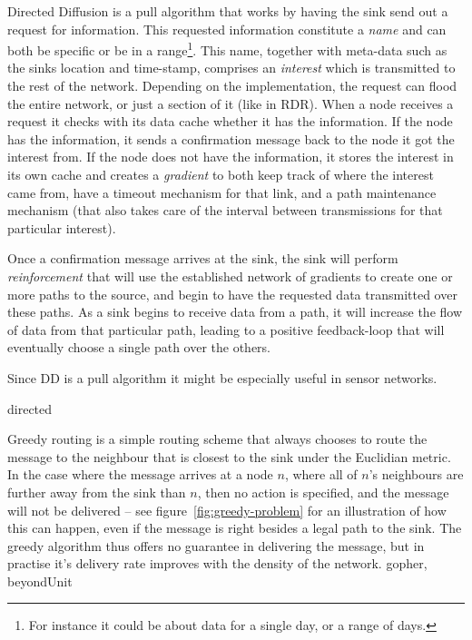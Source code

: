 \begin{description}
{Directed Diffusion is a pull algorithm that works by having the sink send out a request for information. This requested information constitute a \emph{name} and can both be specific or be in a range\footnote{For instance it could be about data for a single day, or a range of days.}. This name, together with meta-data such as the sinks location and time-stamp, comprises an \emph{interest} which is transmitted to the rest of the network. Depending on the implementation, the request can flood the entire network, or just a section of it (like in RDR). When a node receives a request it checks with its data cache whether it has the information. If the node has the information, it sends a confirmation message back to the node it got the interest from. If the node does not have the information, it stores the interest in its own cache and creates a \emph{gradient} to both keep track of where the interest came from, have a timeout mechanism for that link, and a path maintenance mechanism (that also takes care of the interval between transmissions for that particular interest). 

Once a confirmation message arrives at the sink, the sink will perform \emph{reinforcement} that will use the established network of gradients to create one or more paths to the source, and begin to have the requested data transmitted over these paths. As a sink begins to receive data from a path, it will increase the flow of data from that particular path, leading to a positive feedback-loop that will eventually choose a single path over the others.

Since DD is a pull algorithm it might be especially useful in sensor networks.}
{directed}


{\label{section:greedy}Greedy routing is a simple routing scheme that always chooses to route the message to the neighbour that is closest to the sink under the Euclidian metric. In the case where the message arrives at a node $n$, where all of $n$'s neighbours are further away from the sink than $n$, then no action is specified, and the message will not be delivered -- see figure~\ref{fig:greedy-problem} for an illustration of how this can happen, even if the message is right besides a legal path to the sink. The greedy algorithm thus offers no guarantee in delivering the message, but in practise it's delivery rate improves with the density of the network.}
{gopher, beyondUnit}


\end{description}
